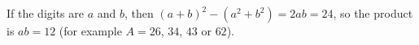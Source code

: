 If the digits are $a$ and $b$, then $(a+b)^2-\left(a^2+b^2\right)=2ab=24$, so the product is $ab=\boxed{12}$ (for example $A=26$, $34$, $43$ or $62$).
